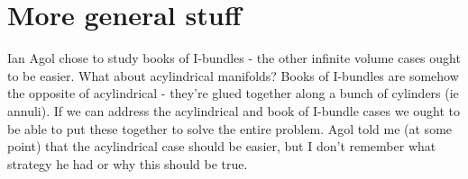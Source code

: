 \documentclass[12pt]{amsart}
\theoremstyle{definition}
\newcommand{\Si}{\Sigma}
\begin{document}
%
%
%
%
%

\section{More general stuff}

Ian Agol chose to study books of I-bundles - the other infinite volume cases
ought to be easier. What about acylindrical manifolds? Books of I-bundles are
somehow the opposite of acylindrical - they're glued together along a bunch of
cylinders (ie annuli). If we can address the acylindrical and book of I-bundle
cases we ought to be able to put these together to solve the entire problem.
Agol told me (at some point) that the acylindrical case should be easier, but
I don't remember what strategy he had or why this should be true.




\end{document}
